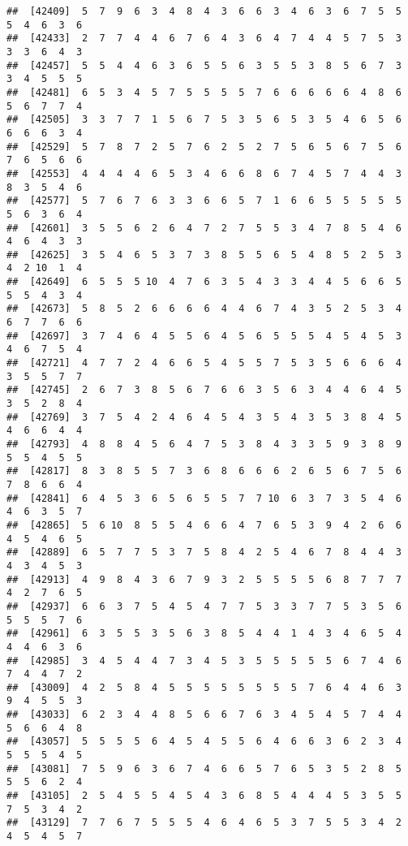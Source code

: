 \documentclass[
]{book}
\begin{document}
\begin{verbatim}
##  [42409]  5  7  9  6  3  4  8  4  3  6  6  3  4  6  3  6  7  5  5  5  4  6  3  6
##  [42433]  2  7  7  4  4  6  7  6  4  3  6  4  7  4  4  5  7  5  3  3  3  6  4  3
##  [42457]  5  5  4  4  6  3  6  5  5  6  3  5  5  3  8  5  6  7  3  3  4  5  5  5
##  [42481]  6  5  3  4  5  7  5  5  5  5  7  6  6  6  6  6  4  8  6  5  6  7  7  4
##  [42505]  3  3  7  7  1  5  6  7  5  3  5  6  5  3  5  4  6  5  6  6  6  6  3  4
##  [42529]  5  7  8  7  2  5  7  6  2  5  2  7  5  6  5  6  7  5  6  7  6  5  6  6
##  [42553]  4  4  4  4  6  5  3  4  6  6  8  6  7  4  5  7  4  4  3  8  3  5  4  6
##  [42577]  5  7  6  7  6  3  3  6  6  5  7  1  6  6  5  5  5  5  5  5  6  3  6  4
##  [42601]  3  5  5  6  2  6  4  7  2  7  5  5  3  4  7  8  5  4  6  4  6  4  3  3
##  [42625]  3  5  4  6  5  3  7  3  8  5  5  6  5  4  8  5  2  5  3  4  2 10  1  4
##  [42649]  6  5  5  5 10  4  7  6  3  5  4  3  3  4  4  5  6  6  5  5  5  4  3  4
##  [42673]  5  8  5  2  6  6  6  6  4  4  6  7  4  3  5  2  5  3  4  6  7  7  6  6
##  [42697]  3  7  4  6  4  5  5  6  4  5  6  5  5  5  4  5  4  5  3  4  6  7  5  4
##  [42721]  4  7  7  2  4  6  6  5  4  5  5  7  5  3  5  6  6  6  4  3  5  5  7  7
##  [42745]  2  6  7  3  8  5  6  7  6  6  3  5  6  3  4  4  6  4  5  3  5  2  8  4
##  [42769]  3  7  5  4  2  4  6  4  5  4  3  5  4  3  5  3  8  4  5  4  6  6  4  4
##  [42793]  4  8  8  4  5  6  4  7  5  3  8  4  3  3  5  9  3  8  9  5  5  4  5  5
##  [42817]  8  3  8  5  5  7  3  6  8  6  6  6  2  6  5  6  7  5  6  7  8  6  6  4
##  [42841]  6  4  5  3  6  5  6  5  5  7  7 10  6  3  7  3  5  4  6  4  6  3  5  7
##  [42865]  5  6 10  8  5  5  4  6  6  4  7  6  5  3  9  4  2  6  6  4  5  4  6  5
##  [42889]  6  5  7  7  5  3  7  5  8  4  2  5  4  6  7  8  4  4  3  4  3  4  5  3
##  [42913]  4  9  8  4  3  6  7  9  3  2  5  5  5  5  6  8  7  7  7  4  2  7  6  5
##  [42937]  6  6  3  7  5  4  5  4  7  7  5  3  3  7  7  5  3  5  6  5  5  5  7  6
##  [42961]  6  3  5  5  3  5  6  3  8  5  4  4  1  4  3  4  6  5  4  4  4  6  3  6
##  [42985]  3  4  5  4  4  7  3  4  5  3  5  5  5  5  5  6  7  4  6  7  4  4  7  2
##  [43009]  4  2  5  8  4  5  5  5  5  5  5  5  5  7  6  4  4  6  3  9  4  5  5  3
##  [43033]  6  2  3  4  4  8  5  6  6  7  6  3  4  5  4  5  7  4  4  5  6  6  4  8
##  [43057]  5  5  5  5  6  4  5  4  5  5  6  4  6  6  3  6  2  3  4  5  5  5  4  5
##  [43081]  7  5  9  6  3  6  7  4  6  6  5  7  6  5  3  5  2  8  5  5  5  6  2  4
##  [43105]  2  5  4  5  5  4  5  4  3  6  8  5  4  4  4  5  3  5  5  7  5  3  4  2
##  [43129]  7  7  6  7  5  5  5  4  6  4  6  5  3  7  5  5  3  4  2  4  5  4  5  7

\end{verbatim}
\end{document}

